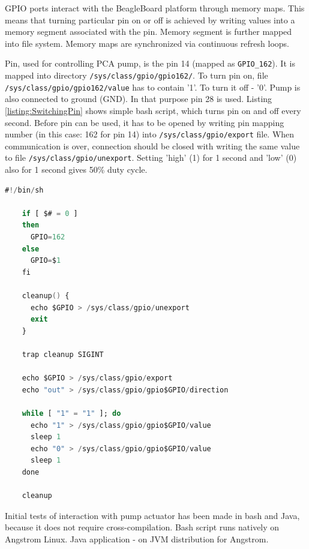 GPIO ports interact with the BeagleBoard platform through memory maps. This means that turning particular pin on or off is achieved by writing values into a memory segment associated with the pin. Memory segment is further mapped into file system. Memory maps are synchronized via continuous refresh loops.

Pin, used for controlling PCA pump, is the pin 14 (mapped as \lstinline{GPIO_162}). It is mapped into directory \lstinline{/sys/class/gpio/gpio162/}. To turn pin on, file \lstinline{/sys/class/gpio/gpio162/value} has to contain '1'. To turn it off - '0'. Pump is also connected to ground (GND). In that purpose pin 28 is used. Listing \ref{listing:SwitchingPin} shows simple bash script, which turns pin on and off every second. Before pin can be used, it has to be opened by writing pin mapping number (in this case: 162 for pin 14) into \lstinline{/sys/class/gpio/export} file. When communication is over, connection should be closed with writing the same value to file \lstinline{/sys/class/gpio/unexport}. Setting 'high' (1) for 1 second and 'low' (0) also for 1 second gives 50\% duty cycle.

\begin{lstlisting}[language=ada, frame=single, gobble=0, caption={Turning pin on and off in bash}, label={listing:SwitchingPin}]
	#!/bin/sh

	if [ $# = 0 ]
	then
	  GPIO=162
	else
	  GPIO=$1
	fi

	cleanup() {
	  echo $GPIO > /sys/class/gpio/unexport
	  exit
	}

	trap cleanup SIGINT

	echo $GPIO > /sys/class/gpio/export
	echo "out" > /sys/class/gpio/gpio$GPIO/direction

	while [ "1" = "1" ]; do
	  echo "1" > /sys/class/gpio/gpio$GPIO/value
	  sleep 1
	  echo "0" > /sys/class/gpio/gpio$GPIO/value
	  sleep 1
	done

	cleanup
\end{lstlisting} 

Initial tests of interaction with pump actuator has been made in bash and Java, because it does not require cross-compilation. Bash script runs natively on Angstrom Linux. Java application - on JVM distribution for Angstrom. 


